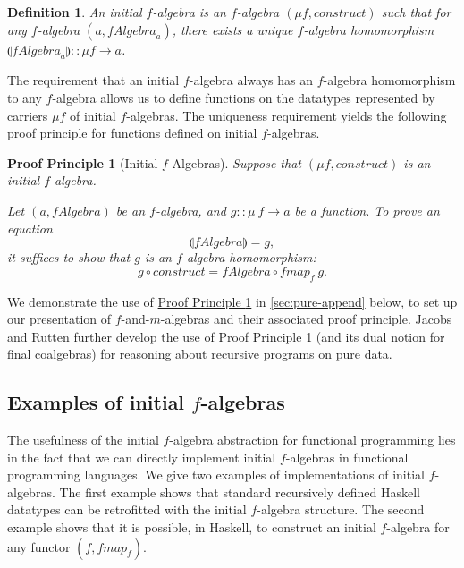 \documentclass{jfp1}
\newcommand{\fold}[1]{\llparenthesis #1 \rrparenthesis}
\newtheorem{definition}{Definition}
\newtheorem{proofprinciple}{Proof Principle}
\newcommand{\proofprinref}[1]{\hyperref[#1]{Proof Principle \ref*{#1}}}
\begin{document}
\begin{definition}
  An \emph{initial $f$-algebra} is an $f$-algebra $(\mu f,
  \mathit{construct})$ such that for any $f$-algebra $(a,
  \mathit{fAlgebra}_a)$, there exists a unique $f$-algebra
  homomorphism $\fold{\mathit{fAlgebra}_a} :: \mu f \to a$.
\end{definition}

The requirement that an initial $f$-algebra always has an $f$-algebra
homomorphism to any $f$-algebra allows us to define functions on the
datatypes represented by carriers $\mu f$ of initial $f$-algebras. The
uniqueness requirement yields the following proof principle for
functions defined on initial $f$-algebras.

\begin{proofprinciple}[Initial $f$-Algebras]\label{pp:initial-alg}
  Suppose that $(\mu f, \mathit{construct})$ is an initial $f$-algebra.

  Let $(a, \mathit{fAlgebra})$ be an $f$-algebra, and $g :: \mu~f \to
  a$ be a function. To prove an equation
  \begin{displaymath}
    \fold{\mathit{fAlgebra}} = g,
  \end{displaymath}
  it suffices to show that $g$ is an $f$-algebra homomorphism:
  \begin{displaymath}
    g \circ \mathit{construct} = \mathit{fAlgebra} \circ \mathit{fmap}_f~g.
  \end{displaymath}
\end{proofprinciple}

We demonstrate the use of \proofprinref{pp:initial-alg} in
\autoref{sec:pure-append} below, to set up our presentation of
$f$-and-$m$-algebras and their associated proof principle. Jacobs and
Rutten \cite{JacobsR11} further develop the use of
\proofprinref{pp:initial-alg} (and its dual notion for final
coalgebras) for reasoning about recursive programs on pure data.

\subsection{Examples of initial \texorpdfstring{$f$}{f}-algebras}
\label{sec:example-initial-f}

The usefulness of the initial $f$-algebra abstraction for functional
programming lies in the fact that we can directly implement initial
$f$-algebras in functional programming languages. We give two examples
of implementations of initial $f$-algebras. The first example shows
that standard recursively defined Haskell datatypes can be retrofitted
with the initial $f$-algebra structure. The second example shows that
it is possible, in Haskell, to construct an initial $f$-algebra for
any functor $(f,\mathit{fmap_f})$.
\end{document}
